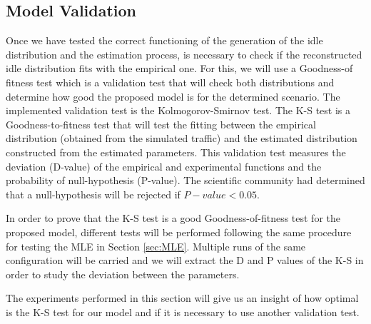 \subsection{Model Validation} \label{sec:ks}
Once we have tested the correct functioning of the generation of the idle distribution and the estimation process, is necessary to check if the reconstructed idle distribution fits with the empirical one. For this, we will use a Goodness-of fitness test which is a validation test that will check both distributions and determine how good the proposed model is for the determined scenario. The implemented validation test is the Kolmogorov-Smirnov test. The \acs{K-S} test is a Goodness-to-fitness test that will test the fitting between the empirical distribution (obtained from the simulated traffic) and the estimated distribution constructed from the estimated parameters. This validation test measures the deviation (D-value) of the empirical and experimental functions and the probability of null-hypothesis (P-value). The scientific community had determined that a null-hypothesis will be rejected if ${P-value<0.05}$.

In order to prove that the \acs{K-S} test is a good Goodness-of-fitness test for the proposed model, different tests will be performed following the same procedure for testing the \acs{MLE} in Section \ref{sec:MLE}. Multiple runs of the same configuration will be carried and we will extract the D and P values of the \acs{K-S} in order to study the deviation between the parameters.

The experiments performed in this section will give us an insight of how optimal is the \acs{K-S} test for our model and if it is necessary to use another validation test.



